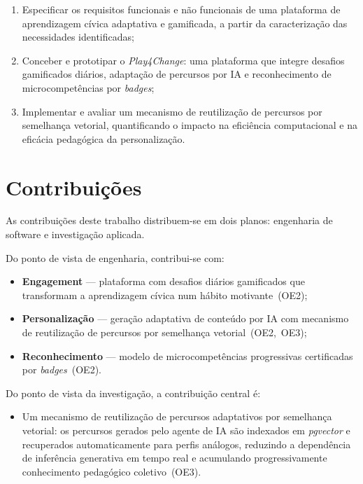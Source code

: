 \begin{enumerate}
  \item[\textbf{OE1}] Especificar os requisitos funcionais e não funcionais de uma
        plataforma de aprendizagem cívica adaptativa e gamificada, a partir da
        caracterização das necessidades identificadas;

  \item[\textbf{OE2}] Conceber e prototipar o \textit{Play4Change}: uma plataforma
        que integre desafios gamificados diários, adaptação de percursos por IA e
        reconhecimento de microcompetências por \textit{badges};

  \item[\textbf{OE3}] Implementar e avaliar um mecanismo de reutilização de percursos
        por semelhança vetorial, quantificando o impacto na eficiência computacional
        e na eficácia pedagógica da personalização.
\end{enumerate}

\section{Contribuições}
\label{sec:contribuicoes}

As contribuições deste trabalho distribuem-se em dois planos: engenharia de software e investigação aplicada.

Do ponto de vista de engenharia, contribui-se com:
\begin{itemize}
  \item \textbf{Engagement} --- plataforma com desafios diários gamificados que
        transformam a aprendizagem cívica num hábito motivante~(OE2);
  \item \textbf{Personalização} --- geração adaptativa de conteúdo por IA com
        mecanismo de reutilização de percursos por semelhança vetorial~(OE2,~OE3);
  \item \textbf{Reconhecimento} --- modelo de microcompetências progressivas
        certificadas por \textit{badges}~(OE2).
\end{itemize}

Do ponto de vista da investigação, a contribuição central é:
\begin{itemize}
  \item Um mecanismo de reutilização de percursos adaptativos por semelhança
        vetorial: os percursos gerados pelo agente de IA são indexados em
        \textit{pgvector} e recuperados automaticamente para perfis análogos,
        reduzindo a dependência de inferência generativa em tempo real e acumulando
        progressivamente conhecimento pedagógico coletivo~(OE3).
\end{itemize}

